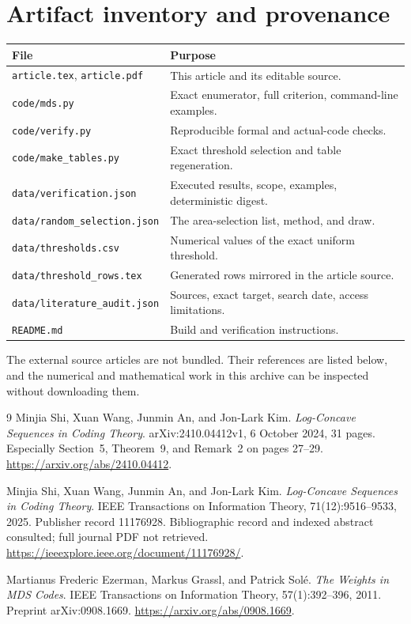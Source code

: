 \documentclass[11pt,letterpaper]{article}
\numberwithin{equation}{section}
\theoremstyle{definition}
\begin{document}
\section{Artifact inventory and provenance}
\begin{center}
\begin{tabular}{@{}p{}p{}@{}}
\toprule
File & Purpose\\
\midrule
\texttt{article.tex}, \texttt{article.pdf} & This article and its editable source.\\
\texttt{code/mds.py} & Exact enumerator, full criterion, command-line examples.\\
\texttt{code/verify.py} & Reproducible formal and actual-code checks.\\
\texttt{code/make\_tables.py} & Exact threshold selection and table regeneration.\\
\texttt{data/verification.json} & Executed results, scope, examples, deterministic digest.\\
\texttt{data/random\_selection.json} & The area-selection list, method, and draw.\\
\texttt{data/thresholds.csv} & Numerical values of the exact uniform threshold.\\
\texttt{data/threshold\_rows.tex} & Generated rows mirrored in the article source.\\
\texttt{data/literature\_audit.json} & Sources, exact target, search date, access limitations.\\
\texttt{README.md} & Build and verification instructions.\\

\bottomrule
\end{tabular}
\end{center}
The external source articles are not bundled. Their references are
listed below, and the numerical and mathematical work in this archive
can be inspected without downloading them.

\begin{thebibliography}{9}
Minjia Shi, Xuan Wang, Junmin An, and Jon-Lark Kim.
\emph{Log-Concave Sequences in Coding Theory}.
arXiv:2410.04412v1, 6 October 2024, 31 pages.
Especially Section~5, Theorem~9, and Remark~2 on pages 27--29.
\url{https://arxiv.org/abs/2410.04412}.

Minjia Shi, Xuan Wang, Junmin An, and Jon-Lark Kim.
\emph{Log-Concave Sequences in Coding Theory}.
IEEE Transactions on Information Theory, 71(12):9516--9533, 2025.
Publisher record 11176928. Bibliographic record and indexed abstract
consulted; full journal PDF not retrieved.
\url{https://ieeexplore.ieee.org/document/11176928/}.

Martianus Frederic Ezerman, Markus Grassl, and Patrick Sol\'e.
\emph{The Weights in MDS Codes}.
IEEE Transactions on Information Theory, 57(1):392--396, 2011.
Preprint arXiv:0908.1669.
\url{https://arxiv.org/abs/0908.1669}.
\end{thebibliography}
\end{document}
